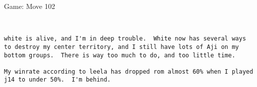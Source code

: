 \documentclass{article}
\begin{document}
\begin{section}{Game: Move 102}
\begin{center}
\cleargoban
{}
\showfullgoban
\\\begin{lstlisting}
white is alive, and I'm in deep trouble.  White now has several ways to destroy my center territory, and I still have lots of Aji on my bottom groups.  There is way too much to do, and too little time. 

My winrate according to leela has dropped rom almost 60% when I played j14 to under 50%.  I'm behind. 


\end{lstlisting}
\end{center}
\end{section}
\end{document}
